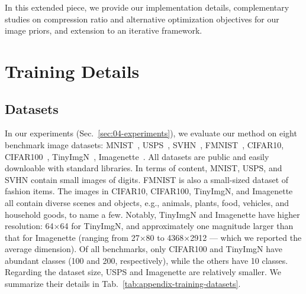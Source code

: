 \renewcommand{\thesection}{A-\Roman{section}}
\renewcommand{\thetable}{A-\Roman{table}}
\renewcommand{\thefigure}{A-\arabic{figure}}
\setcounter{section}{0}
\setcounter{table}{0}
\setcounter{figure}{0}


\begin{foldable} %
    In this extended piece, we provide our implementation details, complementary studies on compression ratio and alternative optimization objectives for our image priors, and extension to an iterative framework.
\end{foldable}


\section{Training Details} \label{sec:app01-training}
\subsection{Datasets} \label{ssec:app01-training-datasets}
\begin{foldable} %
    In our experiments (Sec.~\ref{sec:04-experiments}), we evaluate our method on eight benchmark image datasets: MNIST~\cite{lecun2002gradient}, USPS~\cite{hull1994database}, SVHN~\cite{netzer2011reading}, FMNIST~\cite{xiao2017fashion}, CIFAR10, CIFAR100~\cite{krizhevsky2009learning}, TinyImgN~\cite{le2015tiny}, Imagenette~\cite{howard2020imagenette}.
    All datasets are public and easily downloable with standard libraries.
    In terms of content, MNIST, USPS, and SVHN contain small images of digits.
    FMNIST is also a small-sized dataset of fashion items.
    The images in CIFAR10, CIFAR100, TinyImgN, and Imagenette all contain diverse scenes and objects, e.g., animals, plants, food, vehicles, and household goods, to name a few.
    Notably, TinyImgN and Imagenette have higher resolution: 64$\times$64 for TinyImgN, and approximately one magnitude larger than that for Imagenette (ranging from 27$\times$80 to 4368$\times$2912 --- which we reported the average dimension).
    Of all benchmarks, only CIFAR100 and TinyImgN have abundant classes (100 and 200, respectively), while the others have 10 classes.
    Regarding the dataset size, USPS and Imagenette are relatively smaller.
    We summarize their details in Tab.~\ref{tab:appendix-training-datasets}.
\end{foldable}

